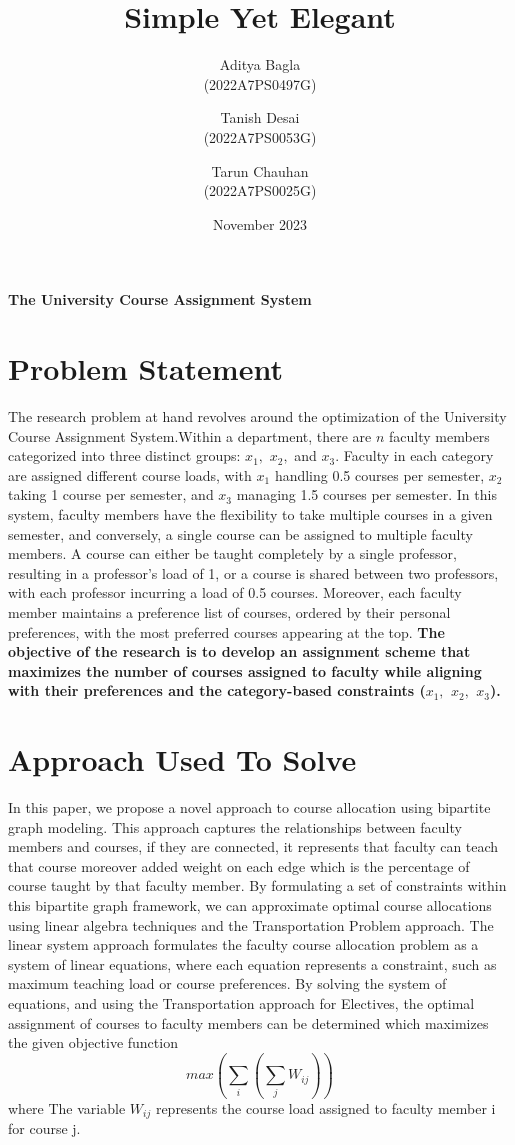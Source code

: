 \documentclass{article}
\title{Simple Yet Elegant}
\author{Aditya Bagla \\
(2022A7PS0497G)\\
\and
Tanish Desai \\
(2022A7PS0053G)\\
\and
Tarun Chauhan \\
(2022A7PS0025G) \\}
\date{November 2023}
\begin{document}
\maketitle
\begin{center}
\textbf{\Large{The University Course Assignment System}}
\end{center}
\section{Problem Statement}
The research problem at hand revolves around the optimization of the University Course Assignment System.Within a department, there are $n$ faculty members categorized into three distinct groups: $x_1,$ $x_2,$ and $x_3.$ Faculty in each category are assigned different course loads, with $x_1$ handling 0.5 courses per semester, $x_2$ taking 1 course per semester, and $x_3$ managing 1.5 courses per semester. In this system, faculty members have the flexibility to take multiple courses in a given semester, and conversely, a single course can be assigned to multiple faculty members. A course can either be taught completely by a single professor, resulting in a professor's load of 1, or a course is shared between two professors, with each professor incurring a load of 0.5 courses.
Moreover, each faculty member maintains a preference list of courses, ordered by their personal preferences, with the most preferred courses appearing at the top. 
\newline
\textbf{The objective of the research is to develop an assignment scheme that maximizes the number of courses assigned to faculty while aligning with their preferences and the category-based constraints ($x_1,$ $x_2,$ $x_3$).}
\section{Approach Used To Solve}
In this paper, we propose a novel approach to course allocation using bipartite graph modeling. This approach captures the relationships between faculty members and courses, if they are connected, it represents that faculty can teach that course moreover added weight on each edge which is the percentage of course taught by that faculty member. By formulating a set of constraints within this bipartite graph framework, we can approximate optimal course allocations using linear algebra techniques and the Transportation Problem approach.
The linear system approach formulates the faculty course allocation problem as a system of linear equations, where each equation represents a constraint, such as maximum teaching load or course preferences. By solving the system of equations, and using the Transportation approach for Electives, the optimal assignment of courses to faculty members can be determined which maximizes the given objective function
\begin{equation}      
max(\sum_{i}(\sum_{j} W_{ij}))
\end{equation}
where The variable $W_{ij}$ represents the course load assigned to faculty member i for course j.
\end{document}
